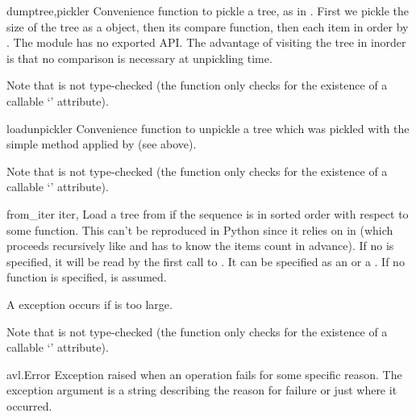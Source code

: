 \documentclass{howto}
\begin{document}
% 
% 
\begin{funcdesc}{dump}{tree,pickler}
	Convenience function to pickle a tree, as in
	.  First we pickle the size of the
	tree as a  object, then its compare function, then
	each item in order by .  The 
	module has no exported API. The advantage of visiting the tree in
	inorder is that no comparison is necessary at unpickling time.
	
	Note that  is not type-checked (the function
	only checks for the existence of a callable `' attribute).
\end{funcdesc}
\begin{funcdesc}{load}{unpickler}
	Convenience function to unpickle a tree which was pickled with the
	simple method applied by  (see above).
	
	Note that  is not type-checked (the
	function only checks for the existence of a callable `'
	attribute).
\end{funcdesc}
\begin{funcdesc}{from_iter}{%
	iter,%
	}
	Load a tree from  if the sequence is in sorted order
	with respect to some  function.  This can't be
	reproduced in Python since it relies on  in
	 (which proceeds recursively like
	 and has to know the items count in advance).
	If no  is specified, it will be read by the first call to
	.  It can be specified as an  or
	a .  If no  function is specified,
	 is assumed.
	
	A  exception occurs if  is too
	large.
	
	Note that  is not type-checked (the function only checks
	for the existence of a callable `' attribute).
\end{funcdesc}

\begin{excdesc}{avl.Error}
Exception raised when an operation fails for some 
specific reason.  The exception argument is a string describing the
reason for failure or just where it occurred.
\end{excdesc}

\end{document}
